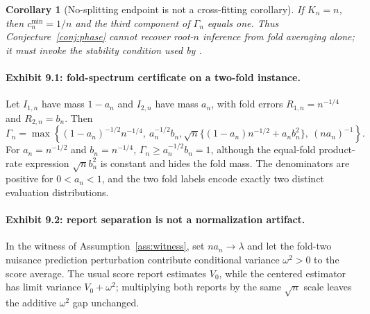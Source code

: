 \documentclass[11pt]{article}
\theoremstyle{definition}
\theoremstyle{plain}
\newtheorem{corollary}{Corollary}
\theoremstyle{remark}
\begin{document}
\begin{corollary}[No-splitting endpoint is not a cross-fitting corollary]\label{cor:loo}
If \(K_n=n\), then \(c_n^{\min}=1/n\) and the third component of \(\Gamma_n\) equals one. Thus Conjecture~\ref{conj:phase} cannot recover root-\(n\) inference from fold averaging alone; it must invoke the stability condition used by \citet{ChenSyrgkanisAustern2022NoSplitDML}.
\end{corollary}

\paragraph{Exhibit 9.1: fold-spectrum certificate on a two-fold instance.}
Let \(I_{1,n}\) have mass \(1-a_n\) and \(I_{2,n}\) have mass \(a_n\), with fold errors \(R_{1,n}=n^{-1/4}\) and \(R_{2,n}=b_n\). Then
\[
  \Gamma_n=\max\left\{(1-a_n)^{-1/2}n^{-1/4},\ a_n^{-1/2}b_n,
  \sqrt n\{(1-a_n)n^{-1/2}+a_nb_n^2\},\ (n a_n)^{-1}\right\}.
\]
For \(a_n=n^{-1/2}\) and \(b_n=n^{-1/4}\), \(\Gamma_n\ge a_n^{-1/2}b_n=1\), although the equal-fold product-rate expression \(\sqrt n b_n^2\) is constant and hides the fold mass. The denominators are positive for \(0<a_n<1\), and the two fold labels encode exactly two distinct evaluation distributions.

\paragraph{Exhibit 9.2: report separation is not a normalization artifact.}
In the witness of Assumption~\ref{ass:witness}, set \(n a_n\to\lambda\) and let the fold-two nuisance prediction perturbation contribute conditional variance \(\omega^2>0\) to the score average. The usual score report estimates \(V_0\), while the centered estimator has limit variance \(V_0+\omega^2\); multiplying both reports by the same \(\sqrt n\) scale leaves the additive \(\omega^2\) gap unchanged.
\end{document}

